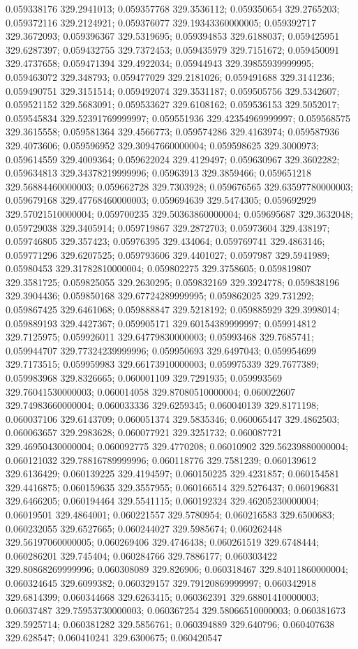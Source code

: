 0.059338176 329.2941013; 0.059357768 329.3536112; 0.059350654 329.2765203; 0.059372116 329.2124921; 0.059376077 329.19343360000005; 0.059392717 329.3672093; 0.059396367 329.5319695; 0.059394853 329.6188037; 0.059425951 329.6287397; 0.059432755 329.7372453; 0.059435979 329.7151672; 0.059450091 329.4737658; 0.059471394 329.4922034; 0.05944943 329.39855939999995; 0.059463072 329.348793; 0.059477029 329.2181026; 0.059491688 329.3141236; 0.059490751 329.3151514; 0.059492074 329.3531187; 0.059505756 329.5342607; 0.059521152 329.5683091; 0.059533627 329.6108162; 0.059536153 329.5052017; 0.059545834 329.52391769999997; 0.059551936 329.42354969999997; 0.059568575 329.3615558; 0.059581364 329.4566773; 0.059574286 329.4163974; 0.059587936 329.4073606; 0.059596952 329.30947660000004; 0.059598625 329.3000973; 0.059614559 329.4009364; 0.059622024 329.4129497; 0.059630967 329.3602282; 0.059634813 329.34378219999996; 0.05963913 329.3859466; 0.059651218 329.56884460000003; 0.059662728 329.7303928; 0.059676565 329.63597780000003; 0.059679168 329.47768460000003; 0.059694639 329.5474305; 0.059692929 329.57021510000004; 0.059700235 329.50363860000004; 0.059695687 329.3632048; 0.059729038 329.3405914; 0.059719867 329.2872703; 0.05973604 329.438197; 0.059746805 329.357423; 0.05976395 329.434064; 0.059769741 329.4863146; 0.059771296 329.6207525; 0.059793606 329.4401027; 0.0597987 329.5941989; 0.05980453 329.31782810000004; 0.059802275 329.3758605; 0.059819807 329.3581725; 0.059825055 329.2630295; 0.059832169 329.3924778; 0.059838196 329.3904436; 0.059850168 329.67724289999995; 0.059862025 329.731292; 0.059867425 329.6461068; 0.059888847 329.5218192; 0.059885929 329.3998014; 0.059889193 329.4427367; 0.059905171 329.60154389999997; 0.059914812 329.7125975; 0.059926011 329.64779830000003; 0.05993468 329.7685741; 0.059944707 329.77324239999996; 0.059950693 329.6497043; 0.059954699 329.7173515; 0.059959983 329.66173910000003; 0.059975339 329.7677389; 0.059983968 329.8326665; 0.060001109 329.7291935; 0.059993569 329.76041530000003; 0.060014058 329.87080510000004; 0.060022607 329.74983660000004; 0.060033336 329.6259345; 0.060040139 329.8171198; 0.060037106 329.6143709; 0.060051374 329.5835346; 0.060065447 329.4862503; 0.060063657 329.2983628; 0.060077921 329.3251732; 0.060087721 329.46950430000004; 0.060092775 329.4770208; 0.06010902 329.56239880000004; 0.060121032 329.78816789999996; 0.060118776 329.7581239; 0.060139612 329.6136429; 0.060139225 329.4194597; 0.060150225 329.4231857; 0.060154581 329.4416875; 0.060159635 329.3557955; 0.060166514 329.5276437; 0.060196831 329.6466205; 0.060194464 329.5541115; 0.060192324 329.46205230000004; 0.06019501 329.4864001; 0.060221557 329.5780954; 0.060216583 329.6500683; 0.060232055 329.6527665; 0.060244027 329.5985674; 0.060262448 329.56197060000005; 0.060269406 329.4746438; 0.060261519 329.6748444; 0.060286201 329.745404; 0.060284766 329.7886177; 0.060303422 329.80868269999996; 0.060308089 329.826906; 0.060318467 329.84011860000004; 0.060324645 329.6099382; 0.060329157 329.79120869999997; 0.060342918 329.6814399; 0.060344668 329.6263415; 0.060362391 329.68801410000003; 0.06037487 329.75953730000003; 0.060367254 329.58066510000003; 0.060381673 329.5925714; 0.060381282 329.5856761; 0.060394889 329.640796; 0.060407638 329.628547; 0.060410241 329.6300675; 0.060420547 